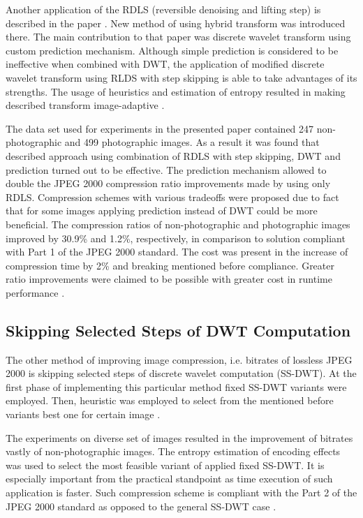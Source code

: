 Another application of the RDLS (reversible denoising and lifting step) is described
in the paper \cite{entropy}. New method of using hybrid transform was introduced there.
The main contribution to that paper was discrete wavelet transform using custom prediction
mechanism. Although simple prediction is considered to be ineffective when combined with DWT,
the application of modified discrete wavelet transform using RLDS with step skipping is able to
take advantages of its strengths. The usage of heuristics and estimation of entropy resulted
in making described transform image-adaptive \cite{entropy}.

The data set used for experiments in the presented paper contained 247 non-photographic and
499 photographic images. As a result it was found that described approach using combination
of RDLS with step skipping, DWT and prediction turned out to be effective. The prediction
mechanism allowed to double the JPEG 2000 compression ratio improvements made by using only RDLS.
Compression schemes with various tradeoffs were proposed due to fact that for some images
applying prediction instead of DWT could be more beneficial. The compression ratios of non-photographic
and photographic images improved by 30.9\% and 1.2\%, respectively, in comparison to solution
compliant with Part 1 of the JPEG 2000 standard. The cost was present in the increase of compression
time by 2\% and breaking mentioned before compliance. Greater ratio improvements were claimed to
be possible with greater cost in runtime performance \cite{entropy}.

\subsection{Skipping Selected Steps of DWT Computation}

The other method of improving image compression, i.e. bitrates of lossless JPEG 2000 is skipping
selected steps of discrete wavelet computation (SS-DWT). At the first phase of implementing
this particular method fixed SS-DWT variants were employed. Then, heuristic was employed to select
from the mentioned before variants best one for certain image \cite{skipping_dwt}.

The experiments on diverse set of images resulted in the improvement of bitrates vastly of
non-photographic images. The entropy estimation of encoding effects was used to select the most
feasible variant of applied fixed SS-DWT. It is especially important from the practical standpoint
as time execution of such application is faster. Such compression scheme is compliant with the Part 2
of the JPEG 2000 standard as opposed to the general SS-DWT case \cite{skipping_dwt}.

